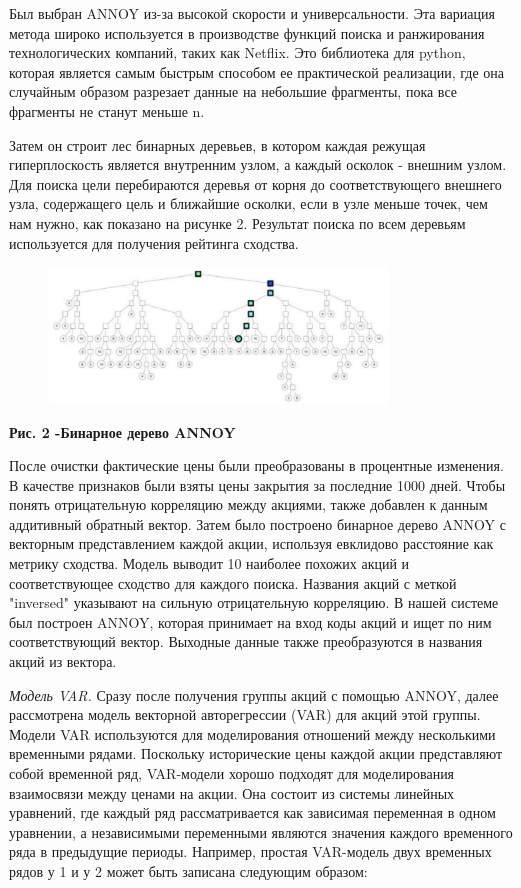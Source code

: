 {Был выбран ANNOY из-за высокой скорости и универсальности. Эта вариация
метода широко используется в производстве функций поиска и ранжирования
технологических компаний, таких как Netflix. Это библиотека для python,
которая является самым быстрым способом ее практической реализации, где
она случайным образом разрезает данные на небольшие фрагменты, пока все
фрагменты не станут меньше n.

Затем он строит лес бинарных деревьев, в котором каждая режущая
гиперплоскость является внутренним узлом, а каждый осколок - внешним
узлом. Для поиска цели перебираются деревья от корня до соответствующего
внешнего узла, содержащего цель и ближайшие осколки, если в узле меньше
точек, чем нам нужно, как показано на рисунке 2. Результат поиска по
всем деревьям используется для получения рейтинга сходства.

\begin{figure}[H]
	\centering
	\includegraphics[width=0.8\textwidth]{media/ict2/image4}
	\caption*{}
\end{figure}


{\bfseries Рис. 2 -Бинарное дерево ANNOY}

После очистки фактические цены были преобразованы в процентные
изменения. В качестве признаков были взяты цены закрытия за последние
1000 дней. Чтобы понять отрицательную корреляцию между акциями, также
добавлен к данным аддитивный обратный вектор. Затем было построено
бинарное дерево ANNOY с векторным представлением каждой акции, используя
евклидово расстояние как метрику сходства. Модель выводит 10 наиболее
похожих акций и соответствующее сходство для каждого поиска. Названия
акций с меткой "inversed" указывают на сильную отрицательную корреляцию.
В нашей системе был построен ANNOY, которая принимает на вход коды акций
и ищет по ним соответствующий вектор. Выходные данные также
преобразуются в названия акций из вектора.

\emph{Модель VAR.} Сразу после получения группы акций с помощью ANNOY,
далее рассмотрена модель векторной авторегрессии (VAR) для акций этой
группы. Модели VAR используются для моделирования отношений между
несколькими временными рядами. Поскольку исторические цены каждой акции
представляют собой временной ряд, VAR-модели хорошо подходят для
моделирования взаимосвязи между ценами на акции. Она состоит из системы
линейных уравнений, где каждый ряд рассматривается как зависимая
переменная в одном уравнении, а независимыми переменными являются
значения каждого временного ряда в предыдущие периоды. Например, простая
VAR-модель двух временных рядов у 1 и у 2 может быть записана следующим
образом:

}

